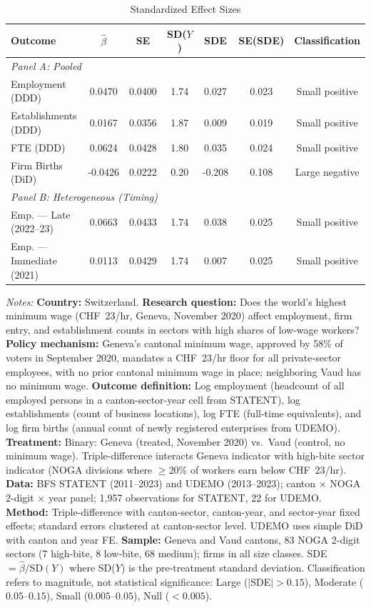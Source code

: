 \begin{table}[htbp]
\centering
\caption{Standardized Effect Sizes}
\label{tab:sde}
\begin{threeparttable}
\small
\begin{tabular}{lcccccc}
\toprule
Outcome & $\hat{\beta}$ & SE & SD($Y$) & SDE & SE(SDE) & Classification \\
\midrule
\multicolumn{7}{l}{\textit{Panel A: Pooled}} \\
Employment (DDD) & 0.0470 & 0.0400 & 1.74 & 0.027 & 0.023 & Small positive \\
Establishments (DDD) & 0.0167 & 0.0356 & 1.87 & 0.009 & 0.019 & Small positive \\
FTE (DDD) & 0.0624 & 0.0428 & 1.80 & 0.035 & 0.024 & Small positive \\
Firm Births (DiD) & -0.0426 & 0.0222 & 0.20 & -0.208 & 0.108 & Large negative \\
\midrule
\multicolumn{7}{l}{\textit{Panel B: Heterogeneous (Timing)}} \\
Emp. --- Late (2022--23) & 0.0663 & 0.0433 & 1.74 & 0.038 & 0.025 & Small positive \\
Emp. --- Immediate (2021) & 0.0113 & 0.0429 & 1.74 & 0.007 & 0.025 & Small positive \\
\bottomrule
\end{tabular}
\begin{tablenotes}[flushleft]
\footnotesize\sloppy
\item \textit{Notes:} \textbf{Country:} Switzerland. \textbf{Research question:} Does the world's highest minimum wage (CHF~23/hr, Geneva, November 2020) affect employment, firm entry, and establishment counts in sectors with high shares of low-wage workers? \textbf{Policy mechanism:} Geneva's cantonal minimum wage, approved by 58\% of voters in September 2020, mandates a CHF~23/hr floor for all private-sector employees, with no prior cantonal minimum wage in place; neighboring Vaud has no minimum wage. \textbf{Outcome definition:} Log employment (headcount of all employed persons in a canton-sector-year cell from STATENT), log establishments (count of business locations), log FTE (full-time equivalents), and log firm births (annual count of newly registered enterprises from UDEMO). \textbf{Treatment:} Binary: Geneva (treated, November 2020) vs.\ Vaud (control, no minimum wage). Triple-difference interacts Geneva indicator with high-bite sector indicator (NOGA divisions where $\geq$20\% of workers earn below CHF~23/hr). \textbf{Data:} BFS STATENT (2011--2023) and UDEMO (2013--2023); canton $\times$ NOGA 2-digit $\times$ year panel; 1,957 observations for STATENT, 22 for UDEMO. \textbf{Method:} Triple-difference with canton-sector, canton-year, and sector-year fixed effects; standard errors clustered at canton-sector level. UDEMO uses simple DiD with canton and year FE. \textbf{Sample:} Geneva and Vaud cantons, 83 NOGA 2-digit sectors (7 high-bite, 8 low-bite, 68 medium); firms in all size classes. SDE $= \hat{\beta} / \text{SD}(Y)$ where SD($Y$) is the pre-treatment standard deviation. Classification refers to magnitude, not statistical significance: Large ($|$SDE$| > 0.15$), Moderate ($0.05$--$0.15$), Small ($0.005$--$0.05$), Null ($< 0.005$).

\end{tablenotes}
\end{threeparttable}
\end{table}
